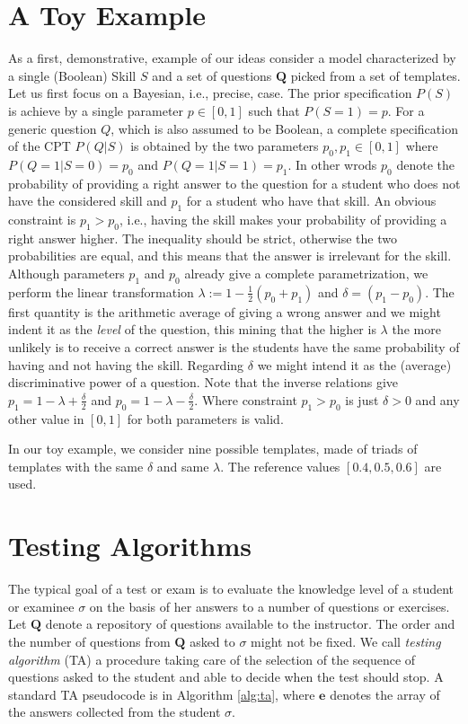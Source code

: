 \documentclass[runningheads]{llncs}
\begin{document}
\section{A Toy Example}
As a first, demonstrative, example of our ideas consider a model characterized by a single (Boolean) Skill $S$ and a set of questions $\bm{Q}$ picked from a set of templates. Let us first focus on a Bayesian, i.e., precise, case. The prior specification $P(S)$ is achieve by a single parameter $p \in [0,1]$ such that $P(S=1)=p$. For a generic question $Q$, which is also assumed to be Boolean, a complete specification of the CPT $P(Q|S)$ is obtained by the two parameters $p_0,p_1\in [0,1]$ where $P(Q=1|S=0)=p_0$ and $P(Q=1|S=1)=p_1$. In other wrods $p_0$ denote the probability of providing a right answer to the question for a student who does not have the considered skill and $p_1$ for a student who have that skill. An obvious constraint is $p_1>p_0$, i.e., having the skill makes your probability of providing a right answer higher. The inequality should be strict, otherwise the two probabilities are equal, and this means that the answer is irrelevant for the skill. Although parameters $p_1$ and $p_0$ already give a complete parametrization, we perform the linear transformation
$\lambda:=1-\frac{1}{2}(p_0+p_1)$ and $\delta=(p_1-p_0)$. The first quantity is the arithmetic average of giving a wrong answer and we might indent it as the \emph{level} of the question, this mining that the higher is $\lambda$ the more unlikely is to receive a correct answer is the students have the same probability of having and not having the skill. Regarding $\delta$ we might intend it as the (average) discriminative power of a question.
Note that the inverse relations give $p_1=1-\lambda+\frac{\delta}{2}$
and $p_0=1-\lambda-\frac{\delta}{2}$. Where constraint $p_1>p_0$ is just $\delta>0$ and any other value in $[0,1]$ for both parameters is valid.


In our toy example, we consider nine possible templates, made of triads of templates with the same $\delta$ and same $\lambda$. The reference values $[0.4,0.5,0.6]$ are used.





\section{Testing Algorithms}
The typical goal of a test or exam is to evaluate the knowledge level of a student or examinee $\sigma$ on the basis of her answers to a number of questions or exercises. Let $\bm{Q}$ denote a repository of questions available to the instructor. The order and the number of questions from $\bm{Q}$ asked to $\sigma$ might not be fixed. We call \emph{testing algorithm} (TA) a procedure taking care of the selection of the sequence of questions asked to the student and able to decide when the test should stop. A standard TA pseudocode is in Algorithm \ref{alg:ta}, where $\bm{e}$ denotes the array of the answers collected from the student $\sigma$.
\end{document}
